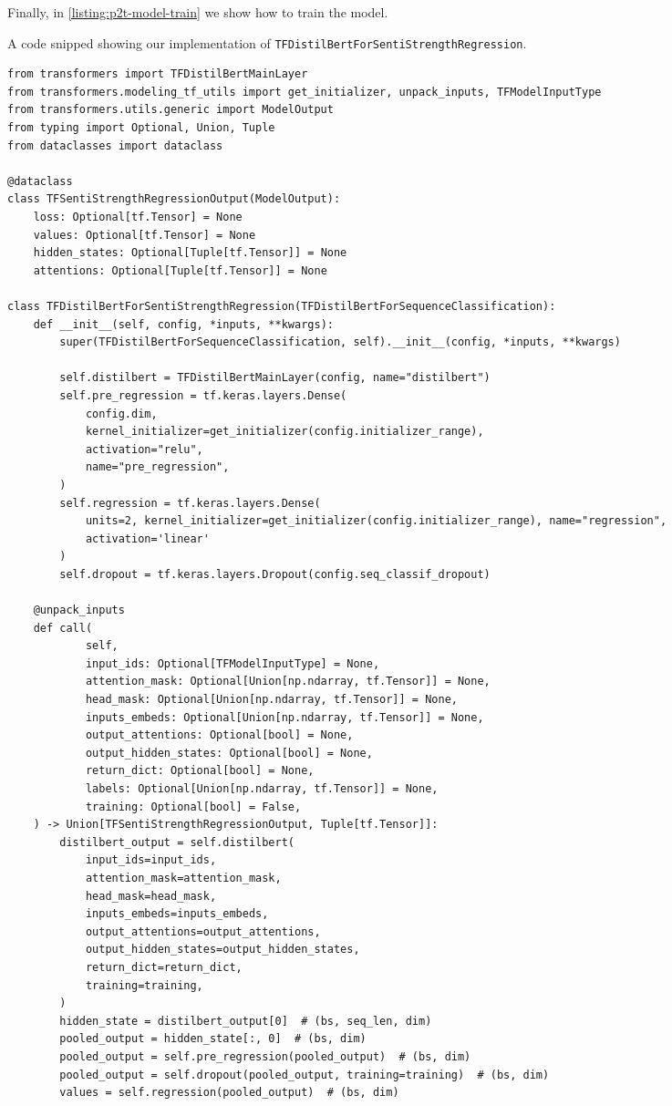 Finally, in \cref{listing:p2t-model-train} we show how to train the model.

\begin{listing*}
\caption{A code snipped showing our implementation of \texttt{TFDistilBertForSentiStrengthRegression}.}
\begin{verbatim}
from transformers import TFDistilBertMainLayer
from transformers.modeling_tf_utils import get_initializer, unpack_inputs, TFModelInputType
from transformers.utils.generic import ModelOutput
from typing import Optional, Union, Tuple
from dataclasses import dataclass

@dataclass
class TFSentiStrengthRegressionOutput(ModelOutput):
    loss: Optional[tf.Tensor] = None
    values: Optional[tf.Tensor] = None
    hidden_states: Optional[Tuple[tf.Tensor]] = None
    attentions: Optional[Tuple[tf.Tensor]] = None

class TFDistilBertForSentiStrengthRegression(TFDistilBertForSequenceClassification):
    def __init__(self, config, *inputs, **kwargs):
        super(TFDistilBertForSequenceClassification, self).__init__(config, *inputs, **kwargs)

        self.distilbert = TFDistilBertMainLayer(config, name="distilbert")
        self.pre_regression = tf.keras.layers.Dense(
            config.dim,
            kernel_initializer=get_initializer(config.initializer_range),
            activation="relu",
            name="pre_regression",
        )
        self.regression = tf.keras.layers.Dense(
            units=2, kernel_initializer=get_initializer(config.initializer_range), name="regression",
            activation='linear'
        )
        self.dropout = tf.keras.layers.Dropout(config.seq_classif_dropout)

    @unpack_inputs
    def call(
            self,
            input_ids: Optional[TFModelInputType] = None,
            attention_mask: Optional[Union[np.ndarray, tf.Tensor]] = None,
            head_mask: Optional[Union[np.ndarray, tf.Tensor]] = None,
            inputs_embeds: Optional[Union[np.ndarray, tf.Tensor]] = None,
            output_attentions: Optional[bool] = None,
            output_hidden_states: Optional[bool] = None,
            return_dict: Optional[bool] = None,
            labels: Optional[Union[np.ndarray, tf.Tensor]] = None,
            training: Optional[bool] = False,
    ) -> Union[TFSentiStrengthRegressionOutput, Tuple[tf.Tensor]]:
        distilbert_output = self.distilbert(
            input_ids=input_ids,
            attention_mask=attention_mask,
            head_mask=head_mask,
            inputs_embeds=inputs_embeds,
            output_attentions=output_attentions,
            output_hidden_states=output_hidden_states,
            return_dict=return_dict,
            training=training,
        )
        hidden_state = distilbert_output[0]  # (bs, seq_len, dim)
        pooled_output = hidden_state[:, 0]  # (bs, dim)
        pooled_output = self.pre_regression(pooled_output)  # (bs, dim)
        pooled_output = self.dropout(pooled_output, training=training)  # (bs, dim)
        values = self.regression(pooled_output)  # (bs, dim)


\end{verbatim}
\end{listing*}
